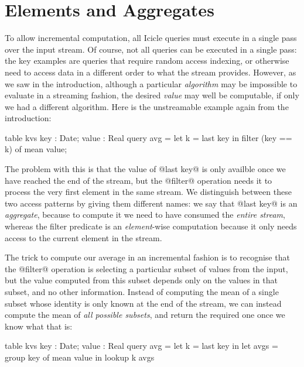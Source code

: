 
\eject
\section{Elements and Aggregates}

To allow incremental computation, all Icicle queries must execute in a single pass over the input stream.
Of course, not all queries can be executed in a single pass: the key examples are queries that require random access indexing, or otherwise need to access data in a different order to what the stream provides.
However, as we saw in the introduction, although a particular \emph{algorithm} may be impossible to evaluate in a streaming fashion, the desired \emph{value} may well be computable, if only we had a different algorithm.
Here is the unstreamable example again from the introduction:
\begin{code}
  table kvs { key : Date; value : Real }
  query avg = let k = last key
              in  filter (key == k) of mean value;
\end{code}

The problem with this is that the value of @last key@ is only availble once we have reached the end of the stream, but the @filter@ operation needs it to process the very first element in the same stream.
We distinguish between these two access patterns by giving them different names: we say that @last key@ is an \emph{aggregate}, because to compute it we need to have consumed the \emph{entire stream}, whereas the filter predicate is an \emph{element}-wise computation because it only needs access to the current element in the stream.

The trick to compute our average in an incremental fashion is to recognise that the @filter@ operation is selecting a particular subset of values from the input, but the value computed from this subset depends only on the values in that subset, and no other information. Instead of computing the mean of a single subset whose identity is only known at the end of the stream, we can instead compute the mean of \emph{all possible subsets}, and return the required one once we know what that is:
\begin{code}
  table kvs { key : Date; value : Real } 
  query avg = let k    = last  key in
              let avgs = group key of mean value
              in  lookup k avgs
\end{code}

